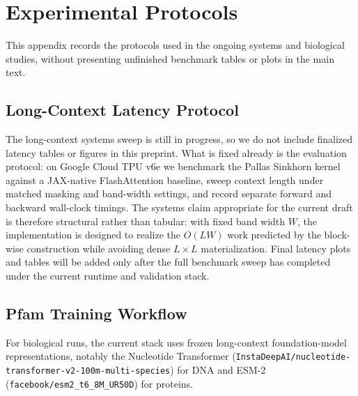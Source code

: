 \documentclass{article}
\begin{document}
\section{Experimental Protocols}
\label{app:protocols}

This appendix records the protocols used in the ongoing systems and biological studies, without presenting unfinished benchmark tables or plots in the main text.

\subsection{Long-Context Latency Protocol}

The long-context systems sweep is still in progress, so we do not include finalized latency tables or figures in this preprint. What is fixed already is the evaluation protocol: on Google Cloud TPU v6e we benchmark the Pallas Sinkhorn kernel against a JAX-native FlashAttention baseline, sweep context length under matched masking and band-width settings, and record separate forward and backward wall-clock timings. The systems claim appropriate for the current draft is therefore structural rather than tabular: with fixed band width $W$, the implementation is designed to realize the $O(LW)$ work predicted by the block-wise construction while avoiding dense $L \times L$ materialization. Final latency plots and tables will be added only after the full benchmark sweep has completed under the current runtime and validation stack.

\subsection{Pfam Training Workflow}

For biological runs, the current stack uses frozen long-context foundation-model representations, notably the Nucleotide Transformer (\nolinkurl{InstaDeepAI/nucleotide-transformer-v2-100m-multi-species}) for DNA and ESM-2 (\nolinkurl{facebook/esm2_t6_8M_UR50D}) for proteins.
\end{document}
